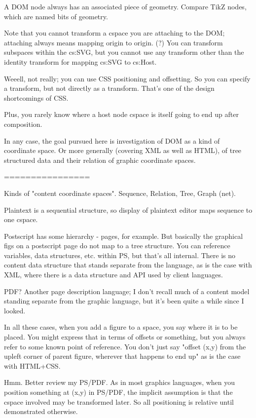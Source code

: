 \documentclass[reqno,12pt]{tufte-handout}
\numberwithin{equation}{subsection}
\numberwithin{equation}{subsection}
\begin{document}
  A DOM node always has an associated piece of geometry.  Compare TikZ
  nodes, which are named bits of geometry.

  Note that you cannot transform a cspace you are attaching to the DOM;
  attaching always means mapping origin to origin. (?)  You can
  transform subspaces within the cs:SVG, but you cannot use any
  transform other than the identity transform for mapping cs:SVG to
  cs:Host.

  Weeell, not really; you can use CSS positioning and offsetting.  So
  you can specify a transform, but not directly as a transform.  That's
  one of the design shortcomings of CSS.

  Plus, you rarely know where a host node cspace is itself going to end
  up after composition.

  In any case, the goal pursued here is investigation of DOM as a kind
  of coordinate space.  Or more generally (covering XML as well as
  HTML), of tree structured data and their relation of graphic
  coordinate spaces.


  ================

  Kinds of "content coordinate spaces".  Sequence, Relation, Tree, Graph
  (net).  

  Plaintext is a sequential structure, so display of plaintext editor
  maps sequence to one cspace.

  Postscript has some hierarchy - pages, for example.  But basically the
  graphical figs on a postscript page do not map to a tree structure.
  You can reference variables, data structures, etc. within PS, but
  that's all internal.  There is no content data structure that stands
  separate from the language, as is the case with XML, where there is a
  data structure and API used by client languages.

  PDF?  Another page description language; I don't recall much of a
  content model standing separate from the graphic language, but it's
  been quite a while since I looked.

  In all these cases, when you add a figure to a space, you say where it
  is to be placed.  You might express that in terms of offsets or
  something, but you always refer to some known point of reference.  You
  don't just say "offset (x,y) from the upleft corner of parent
  figure, wherever that happens to end up" as is the case with HTML+CSS.

  Hmm.  Better review my PS/PDF.  As in most graphics languages, when
  you position something at (x,y) in PS/PDF, the implicit assumption is
  that the cspace involved may be transformed later.  So all positioning
  is relative until demonstrated otherwise.
\end{document}
